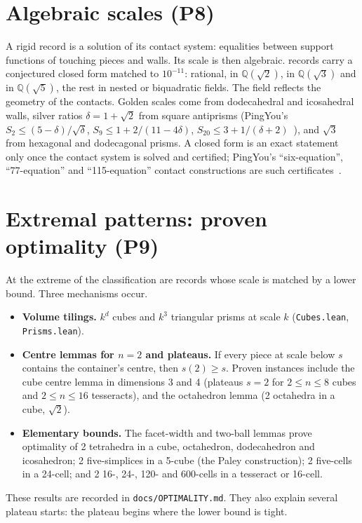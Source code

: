 \documentclass[11pt,a4paper]{article}
\newcommand{\Q}{\mathbb Q}
\newcommand{\code}[1]{\texttt{\nolinkurl{#1}}}
\theoremstyle{definition}
\theoremstyle{remark}
\begin{document}
\section{Algebraic scales (P8)}

A rigid record is a solution of its contact system: equalities between support functions of touching pieces and walls. Its scale is then algebraic. \nClosedForms{} records carry a conjectured closed form matched to $10^{-11}$: \nRational{} rational, \nSqrtTwo{} in $\Q(\sqrt2)$, \nSqrtThree{} in $\Q(\sqrt3)$ and \nSqrtFive{} in $\Q(\sqrt5)$, the rest in nested or biquadratic fields. The field reflects the geometry of the contacts. Golden scales come from dodecahedral and icosahedral walls, silver ratios $\delta=1+\sqrt2$ from square antiprisms (PingYou's $S_2\le(5-\delta)/\sqrt\delta$, $S_9\le1+2/(11-4\delta)$, $S_{20}\le3+1/(\delta+2)$~\cite{pingArrows}), and $\sqrt3$ from hexagonal and dodecagonal prisms. A closed form is an exact statement only once the contact system is solved and certified; PingYou's ``six-equation'', ``77-equation'' and ``115-equation'' contact constructions are such certificates~\cite{pingArrows}.

\section{Extremal patterns: proven optimality (P9)}\label{sec:extremal}

At the extreme of the classification are records whose scale is matched by a lower bound. Three mechanisms occur.
\begin{itemize}
\item \textbf{Volume tilings.} $k^d$ cubes and $k^3$ triangular prisms at scale $k$ (\code{Cubes.lean}, \code{Prisms.lean}).
\item \textbf{Centre lemmas for $n=2$ and plateaus.} If every piece at scale below $s$ contains the container's centre, then $s(2)\ge s$. Proven instances include the cube centre lemma in dimensions 3 and 4 (plateaus $s=2$ for $2\le n\le 8$ cubes and $2\le n\le 16$ tesseracts), and the octahedron lemma (2 octahedra in a cube, $\sqrt2$).
\item \textbf{Elementary bounds.} The facet-width and two-ball lemmas prove optimality of 2 tetrahedra in a cube, octahedron, dodecahedron and icosahedron; 2 five-simplices in a 5-cube (the Paley construction); 2 five-cells in a 24-cell; and 2 16-, 24-, 120- and 600-cells in a tesseract or 16-cell.
\end{itemize}
These results are recorded in \code{docs/OPTIMALITY.md}. They also explain several plateau starts: the plateau begins where the lower bound is tight.
\end{document}
